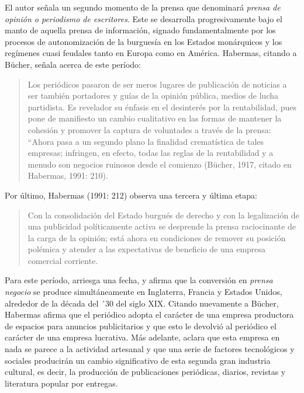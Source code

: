 {El autor señala un segundo momento de la prensa que denominará \emph{prensa de opinión o periodismo de escritores}. Este se desarrolla progresivamente bajo el manto de aquella prensa de información, signado fundamentalmente por los procesos de autonomización de la burguesía en los Estados monárquicos y los regímenes cuasi feudales tanto en Europa como en América. Habermas, citando a Bücher, señala acerca de este período:

\begin{quote}
Los periódicos pasaron de ser meros lugares de publicación de noticias a ser también portadores y guías de la opinión pública, medios de lucha partidista. Es revelador su énfasis en el desinterés por la rentabilidad, pues pone de manifiesto un cambio cualitativo en las formas de mantener la cohesión y promover la captura de voluntades a través de la prensa: ``Ahora pasa a un segundo plano la finalidad crematística de tales empresas; infringen, en efecto, todas las reglas de la rentabilidad y a menudo son negocios ruinosos desde el comienzo (Bücher, 1917, citado en Habermas, 1991: 210).
\end{quote}

Por último, Habermas (1991: 212) observa una tercera y última etapa:

\begin{quote}
Con la consolidación del Estado burgués de derecho y con la legalización de una publicidad políticamente activa se desprende la prensa raciocinante de la carga de la opinión; está ahora en condiciones de remover su posición polémica y atender a las expectativas de beneficio de una empresa comercial corriente.
\end{quote}

Para este período, arriesga una fecha, y afirma que la conversión en \emph{prensa negocio} se produce simultáneamente en Inglaterra, Francia y Estados Unidos, alrededor de la década del ´30 del siglo XIX. Citando nuevamente a Bücher, Habermas afirma que el periódico adopta el carácter de una empresa productora de espacios para anuncios publicitarios y que esto le devolvió al periódico el carácter de una empresa lucrativa. Más adelante, aclara que esta empresa en nada se parece a la actividad artesanal y que una serie de factores tecnológicos y sociales producirán un cambio significativo de esta segunda gran industria cultural, es decir, la producción de publicaciones periódicas, diarios, revistas y literatura popular por entregas.

}
